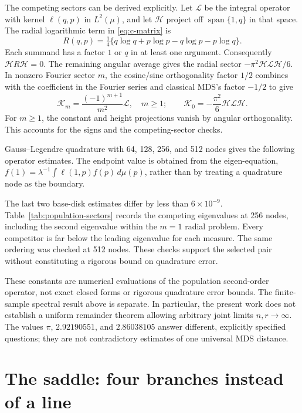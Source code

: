 \documentclass[11pt]{article}
\theoremstyle{remark}\newtheorem{remark}[proposition]{Remark}
\begin{document}
The competing sectors can be derived explicitly. Let $\mathcal L$ be the
integral operator with kernel $\ell(q,p)$ in $L^2(\mu)$, and let
$\mathcal H$ project off $\operatorname{span}\{1,q\}$ in that space. The radial
logarithmic term in \eqref{eq:c-matrix} is
\begin{equation}
 R(q,p)=\tfrac14\{q\log q+p\log p-q\log p-p\log q\}.
\end{equation}
Each summand has a factor $1$ or $q$ in at least one argument. Consequently
$\mathcal H R\mathcal H=0$. The remaining angular average gives the radial
sector $-\pi^2\mathcal H\mathcal L\mathcal H/6$. In nonzero Fourier sector $m$,
the cosine/sine orthogonality factor $1/2$ combines with the coefficient in
the Fourier series and classical MDS's factor $-1/2$ to give
\begin{equation}\label{eq:angular-sectors}
 \mathcal K_m=\frac{(-1)^{m+1}}{m^2}\mathcal L,\quad m\ge1;
 \qquad \mathcal K_0=-\frac{\pi^2}{6}\mathcal H\mathcal L\mathcal H.
\end{equation}
For $m\ge1$, the constant and height projections vanish by angular
orthogonality. This accounts for the signs and the competing-sector checks.

Gauss--Legendre quadrature with 64, 128, 256, and 512 nodes gives the following
operator estimates. The endpoint value is obtained from the eigen-equation,
$f(1)=\lambda^{-1}\int\ell(1,p)f(p)\,d\mu(p)$, rather than by treating a
quadrature node as the boundary.

The last two base-disk estimates differ by less than $6\times10^{-9}$.
Table~\ref{tab:population-sectors} records the competing eigenvalues at 256
nodes, including the second eigenvalue within the $m=1$ radial problem.
Every competitor is far below the leading eigenvalue for each measure.
The same ordering was checked at 512 nodes. These checks support the selected
pair without constituting a rigorous bound on quadrature error.


These constants are numerical evaluations of the population second-order
operator, not exact closed forms or rigorous quadrature error bounds. The
finite-sample spectral result above is separate. In particular, the present
work does not establish a uniform remainder theorem allowing arbitrary joint
limits $n,r\to\infty$. The values $\pi$, $2.92190551$, and $2.86038105$ answer
different, explicitly specified questions; they are not contradictory estimates
of one universal MDS distance.

\section{The saddle: four branches instead of a line}\label{sec:saddle}
\end{document}
